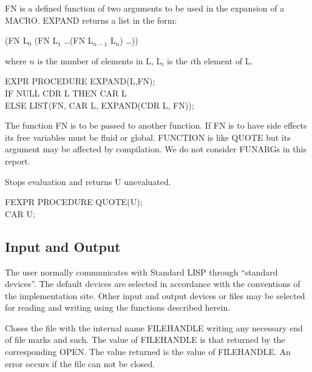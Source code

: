 \documentclass[11pt,letterpaper]{book}
\begin{document}
{FN is a defined function of two arguments to be used in the expansion
of a MACRO. EXPAND returns a list in the form:

\vspace{.15in}
(FN L$_0$ (FN L$_1$ \ldots (FN L$_{n-1}$ L$_n$) \ldots ))
\vspace{.15in}

where $n$ is the number of elements in L, L$_i$ is the $i$th element
of L.

{\tt \begin{tabbing} EXPR PROCEDURE EXPAND(L,FN); \\
\hspace*{1em} IF NULL CDR L THEN CAR L \\
\hspace*{2em} ELSE LIST(FN, CAR L, EXPAND(CDR L, FN));
\end{tabbing}}}

{The function FN is to be passed to another function. If FN is to have
side effects its free variables must be fluid or global. FUNCTION is
like QUOTE but its argument may be affected by compilation. We do not
consider FUNARGs in this report.}


{Stops evaluation and returns U unevaluated.

{\tt \begin{tabbing} FEXPR PROCEDURE QUOTE(U); \\
\hspace*{2em}CAR U;
\end{tabbing}}}

\subsection{Input and Output}
\label{IO}
The user normally communicates with Standard LISP through
``standard devices''. The default devices are selected in accordance
with the conventions of the implementation site. Other input and
output devices or files may be selected for reading and writing using
the functions described herein.



{Closes the file with the internal name FILEHANDLE writing any
necessary end of file marks and such. The value of FILEHANDLE is that
returned by the corresponding OPEN.  The value returned is
the value of FILEHANDLE. An error occurs if the file can not be
 
closed.

}
\end{document}
